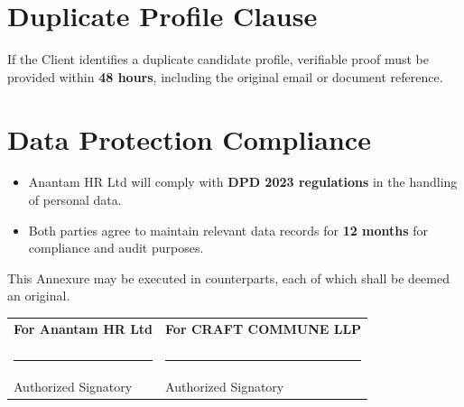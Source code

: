\documentclass[12pt]{article}
\begin{document}
\section{Duplicate Profile Clause}

If the Client identifies a duplicate candidate profile, verifiable proof must be provided within \textbf{48 hours}, including the original email or document reference.

\section{Data Protection Compliance}

\begin{itemize}
\item Anantam HR Ltd will comply with \textbf{DPD 2023 regulations} in the handling of personal data.

\item Both parties agree to maintain relevant data records for \textbf{12 months} for compliance and audit purposes.
\end{itemize}

This Annexure may be executed in counterparts, each of which shall be deemed an original.

\vspace{1.5cm}

\begin{tabular}{p{7cm} p{7cm}}

\textbf{For Anantam HR Ltd} & \textbf{For CRAFT COMMUNE LLP} \\

\vspace{2cm} & \vspace{2cm} \\

\rule{6cm}{0.4pt} & \rule{6cm}{0.4pt} \\
Authorized Signatory & Authorized Signatory \\

\end{tabular}
\end{document}
